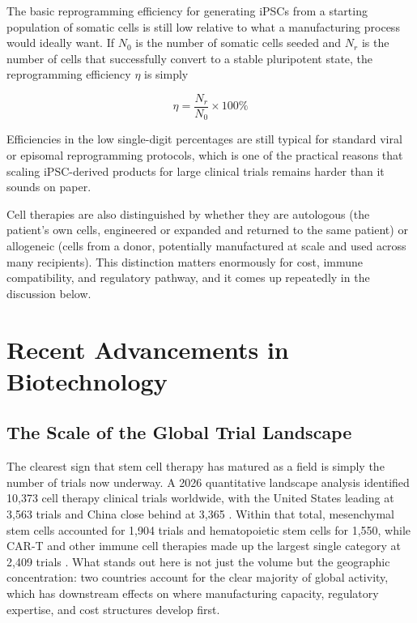 \documentclass[11pt]{article}
\begin{document}
The basic reprogramming efficiency for generating iPSCs from a starting population of somatic cells is still low relative to what a manufacturing process would ideally want. If $N_0$ is the number of somatic cells seeded and $N_r$ is the number of cells that successfully convert to a stable pluripotent state, the reprogramming efficiency $\eta$ is simply

\begin{equation}
\eta = \frac{N_r}{N_0} \times 100\%
\end{equation}

Efficiencies in the low single-digit percentages are still typical for standard viral or episomal reprogramming protocols, which is one of the practical reasons that scaling iPSC-derived products for large clinical trials remains harder than it sounds on paper.

Cell therapies are also distinguished by whether they are autologous (the patient's own cells, engineered or expanded and returned to the same patient) or allogeneic (cells from a donor, potentially manufactured at scale and used across many recipients). This distinction matters enormously for cost, immune compatibility, and regulatory pathway, and it comes up repeatedly in the discussion below.

\section{Recent Advancements in Biotechnology}

\subsection{The Scale of the Global Trial Landscape}

The clearest sign that stem cell therapy has matured as a field is simply the number of trials now underway. A 2026 quantitative landscape analysis identified 10,373 cell therapy clinical trials worldwide, with the United States leading at 3,563 trials and China close behind at 3,365 \cite{panoramic2026}. Within that total, mesenchymal stem cells accounted for 1,904 trials and hematopoietic stem cells for 1,550, while CAR-T and other immune cell therapies made up the largest single category at 2,409 trials \cite{panoramic2026}. What stands out here is not just the volume but the geographic concentration: two countries account for the clear majority of global activity, which has downstream effects on where manufacturing capacity, regulatory expertise, and cost structures develop first.
\end{document}
